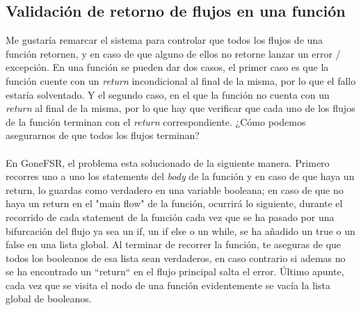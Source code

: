 \subsection{Validación de retorno de flujos en una función}
Me gustaría remarcar el sistema para controlar que todos los flujos de una función retornen, y en caso de que alguno de ellos no retorne lanzar un error / excepción. En una función se pueden dar dos casos, el primer caso es que la función cuente con un \textit{return} incondicional al final de la misma, por lo que el fallo estaría solventado. Y el segundo caso, en el que la función no cuenta con un \textit{return} al final de la misma, por lo que hay que verificar que cada uno de los flujos de la función terminan con el \textit{return} correspondiente. ¿Cómo podemos asegurarnos de que todos los flujos terminan? \\\\ 
En GoneFSR, el problema esta solucionado de la siguiente manera. Primero recorres uno a uno los statements del \textit{body} de la función y en caso de que haya un return, lo guardas como verdadero en una variable booleana; en caso de que no haya un return en el "main flow" de la función, ocurrirá lo siguiente, durante el recorrido de cada statement de la función cada vez que se ha pasado por una bifurcación del flujo ya sea un if, un if else o un while, se ha añadido un true o un false en una lista global. Al terminar de recorrer la función, te aseguras de que todos los booleanos de esa lista sean verdaderos, en caso contrario si ademas no se ha encontrado un ``return`` en el flujo principal salta el error. Último apunte, cada vez que se visita el nodo de una función evidentemente se vacía la lista global de booleanos.
